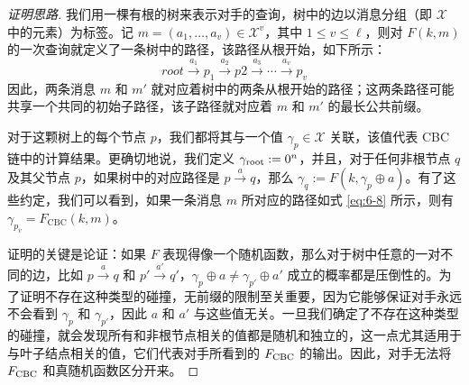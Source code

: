 \begin{proof}[证明思路]
我们用一棵有根的树来表示对手的查询，树中的边以消息分组（即 $\mathcal{X}$ 中的元素）为标签。记 $m=(a_1,\dots,a_v)\in\mathcal{X}^{v}$，其中 $1\leq v\leq\ell$，则对 $F(k,m)$ 的一次查询就定义了一条树中的路径，该路径从根开始，如下所示：
\begin{equation}\label{eq:6-8}
root\overset{a_1}\longrightarrow p_1\overset{a_2}\longrightarrow p2 \overset{a_3}\longrightarrow\cdots \overset{a_v}\longrightarrow p_v
\end{equation}
因此，两条消息 $m$ 和 $m'$ 就对应着树中的两条从根开始的路径；这两条路径可能共享一个共同的初始子路径，该子路径就对应着 $m$ 和 $m'$ 的最长公共前缀。

对于这颗树上的每个节点 $p$，我们都将其与一个值 $\gamma_p\in\mathcal{X}$ 关联，该值代表 CBC 链中的计算结果。更确切地说，我们定义 $\gamma_{\rm root}:=0^n$，并且，对于任何非根节点 $q$ 及其父节点 $p$，如果树中的对应路径是 $p\overset{a}\rightarrow q$，那么 $\gamma_q:=F(k,\gamma_p\oplus a)$。有了这些约定，我们可以看到，如果一条消息 $m$ 所对应的路径如式 \ref{eq:6-8} 所示，则有 $\gamma_{p_v}=F_\mathrm{CBC}(k,m)$。

证明的关键是论证：如果 $F$ 表现得像一个随机函数，那么对于树中任意的一对不同的边，比如 $p\overset{a}\rightarrow q$ 和 $p'\overset{a'}\rightarrow q'$，$\gamma_p\oplus a\neq\gamma_{p'}\oplus a'$ 成立的概率都是压倒性的。为了证明不存在这种类型的碰撞，无前缀的限制至关重要，因为它能够保证对手永远不会看到 $\gamma_p$ 和 $\gamma_{p'}$，因此 $a$ 和 $a'$ 与这些值无关。一旦我们确定了不存在这种类型的碰撞，就会发现所有和非根节点相关的值都是随机和独立的，这一点尤其适用于与叶子结点相关的值，它们代表对手所看到的 $F_{\rm CBC}$ 的输出。因此，对手无法将 $F_{\rm CBC}$ 和真随机函数区分开来。
\end{proof}

